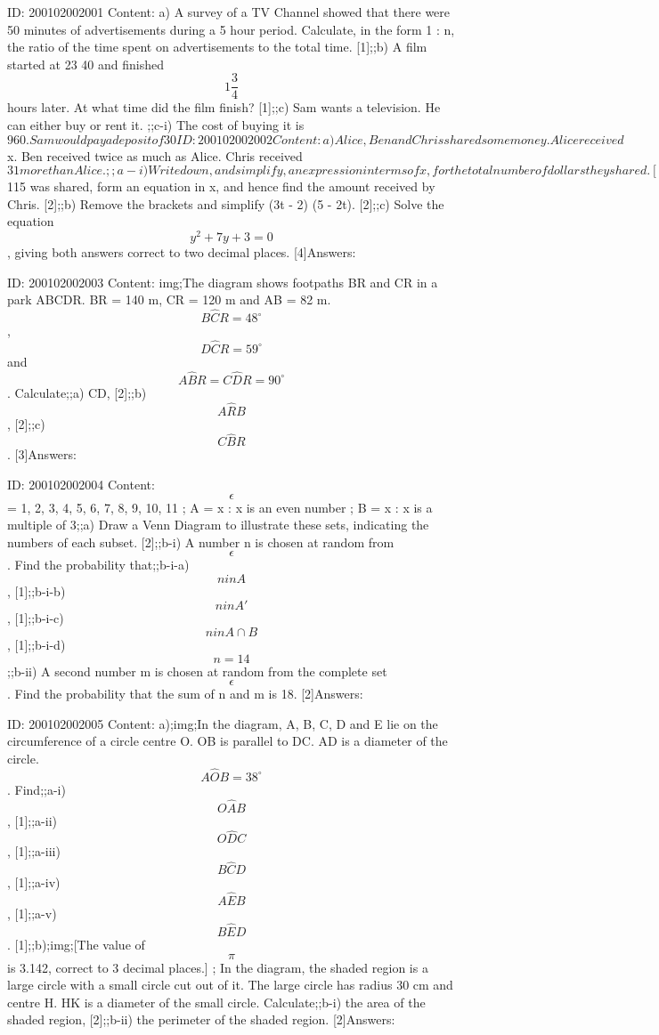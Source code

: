 \documentclass{article}
\begin{document}
ID: 200102002001
Content:
a) A survey of a TV Channel showed that there were 50 minutes of advertisements during a 5 hour period. Calculate, in the form 1 : n, the ratio of the time spent on	advertisements to the total time. [1];;b) A film started at 23 40 and finished $$1\frac{3}{4}$$ hours later. At what time did the film finish? [1];;c) Sam wants a television. He can either buy or rent it. ;;c-i) The cost of buying it is $960. Sam would pay a deposit of 30%

ID: 200102002002
Content:
a) Alice, Ben and Chris shared some money. Alice received $x. Ben received twice as much as Alice. Chris received $31 more than Alice.;;a-i) Write down, and simplify, an expression in terms of x, for the total number of dollars they shared. [2];;a-ii) Given that $115 was shared, form an equation in x, and hence find the amount received by Chris. [2];;b) Remove the brackets and simplify (3t - 2) (5 - 2t). [2];;c) Solve the equation $$y^{2} +7y+3=0$$, giving both answers correct to two decimal places. [4]Answers:

ID: 200102002003
Content:
img;The diagram shows footpaths BR and CR in a park ABCDR. BR = 140 m, CR = 120 m and AB = 82 m. $$B \hat CR=48^{\circ}$$, $$D \hat CR=59^{\circ}$$ and $$A \hat BR=C \hat DR=90^{\circ}$$. Calculate;;a) CD, [2];;b) $$A \hat RB$$, [2];;c) $$C \hat BR$$. [3]Answers:

ID: 200102002004
Content:
$$\epsilon$$ = {1, 2, 3, 4, 5, 6, 7, 8, 9, 10, 11} ; A = {x : x is an even number} ; B = {x : x is a multiple of 3};;a) Draw a Venn Diagram to illustrate these sets, indicating the numbers of each subset. [2];;b-i) A number n is chosen at random from $$\epsilon$$. Find the probability that;;b-i-a) $$n in A$$, [1];;b-i-b) $$n in A'$$ , [1];;b-i-c) $$n in A \cap B$$, [1];;b-i-d) $$n = 14$$;;b-ii) A second number m is chosen at random from the complete set $$\epsilon$$. Find the probability that the sum of n and m is 18. [2]Answers:

ID: 200102002005
Content:
a);img;In the diagram, A, B, C, D and E lie on the circumference of a circle centre O. OB is parallel to DC. AD is a diameter of the circle. $$A \hat OB=38^{\circ}$$. Find;;a-i) $$O \hat AB$$, [1];;a-ii) $$O \hat DC$$, [1];;a-iii) $$B \hat CD$$, [1];;a-iv) $$A \hat EB$$, [1];;a-v) $$B \hat ED$$. [1];;b);img;[The value of $$\pi$$ is 3.142, correct to 3 decimal places.] ; In the diagram, the shaded region is a large circle with a small circle cut out of it. The large circle has radius 30 cm and centre H. HK is a diameter of the small circle. Calculate;;b-i) the area of the shaded region, [2];;b-ii) the perimeter of the shaded region. [2]Answers:
\end{document}
